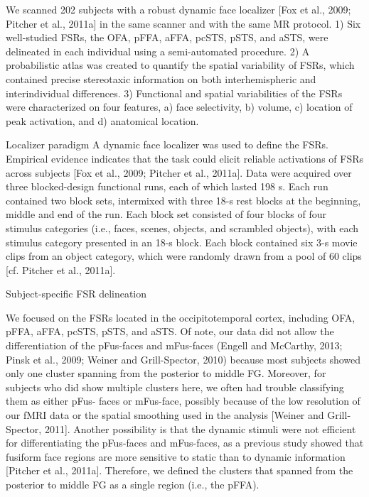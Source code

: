 %
We scanned 202 subjects with a robust dynamic face localizer [Fox et al., 2009;
Pitcher et al., 2011a] in the same scanner and with the same MR protocol.
%
1) Six well-studied FSRs, the OFA, pFFA, aFFA, pcSTS, pSTS, and aSTS, were
delineated in each individual using a semi-automated procedure.
%
2) A probabilistic atlas was created to quantify the spatial variability of
FSRs, which contained precise stereotaxic information on both interhemispheric
and interindividual differences.
%
3) Functional and spatial variabilities of the FSRs were characterized on four
features, a) face selectivity, b) volume, c) location of peak activation, and d)
anatomical location.
%

Localizer paradigm
%
A dynamic face localizer was used to define the FSRs.
%
Empirical evidence indicates that the task could elicit reliable activations of
FSRs across subjects [Fox et al., 2009; Pitcher et al., 2011a].
%
Data were acquired over three blocked-design functional runs, each of which
lasted 198 s.
%
Each run contained two block sets, intermixed with three 18-s rest blocks at the
beginning, middle and end of the run.
%
Each block set consisted of four blocks of four stimulus categories (i.e.,
faces, scenes, objects, and scrambled objects), with each stimulus category
presented in an 18-s block.
%
Each block contained six 3-s movie clips from an object category, which were
randomly drawn from a pool of 60 clips [cf. Pitcher et al., 2011a].
%

Subject-specific FSR delineation

We focused on the FSRs located in the occipitotemporal cortex, including OFA,
pFFA, aFFA, pcSTS, pSTS, and aSTS.
%
Of note, our data did not allow the differentiation of the pFus-faces and
mFus-faces (Engell and McCarthy, 2013; Pinsk et al., 2009; Weiner and
Grill-Spector, 2010) because most subjects showed only one cluster spanning from
the posterior to middle FG.
%
Moreover, for subjects who did show multiple clusters here, we often had trouble
classifying them as either pFus- faces or mFus-face, possibly because of the low
resolution of our fMRI data or the spatial smoothing used in the analysis
[Weiner and Grill- Spector, 2011].
%
Another possibility is that the dynamic stimuli were not efficient for
differentiating the pFus-faces and mFus-faces, as a previous study showed that
fusiform face regions are more sensitive to static than to dynamic information
[Pitcher et al., 2011a].
%
Therefore, we defined the clusters that spanned from the posterior to middle FG
as a single region (i.e., the pFFA).

